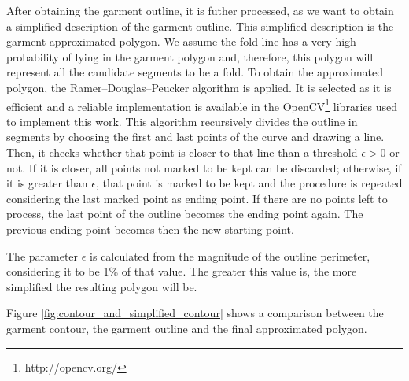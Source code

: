 After obtaining the garment outline, it is futher processed, as we want to obtain a simplified description of the garment outline. This simplified description is the garment approximated polygon. We assume the fold line has a very high probability of lying in the garment polygon and, therefore, this polygon will represent all the candidate segments to be a fold. To obtain the approximated polygon, the Ramer–Douglas–Peucker algorithm \cite{ramer1972iterative, douglas1973algorithms} is applied. It is selected as it is efficient and a reliable implementation is available in the OpenCV\footnote{http://opencv.org/} libraries used to implement this work. This algorithm recursively divides the outline in segments by choosing the first and last points of the curve and drawing a line. Then, it checks whether that point is closer to that line than a threshold $\epsilon > 0$ or not. If it is closer, all points not marked to be kept can be discarded; otherwise, if it is greater than $\epsilon$, that point is marked to be kept and the procedure is repeated considering the last marked point as ending point. If there are no points left to process, the last point of the outline becomes the ending point again. The previous ending point becomes then the new starting point.

The parameter $\epsilon$ is calculated from the magnitude of the outline perimeter, considering it to be 1\% of that value. The greater this value is, the more simplified the resulting polygon will be.

Figure \ref{fig:contour_and_simplified_contour} shows a comparison between the garment contour, the garment outline and the final approximated polygon.


